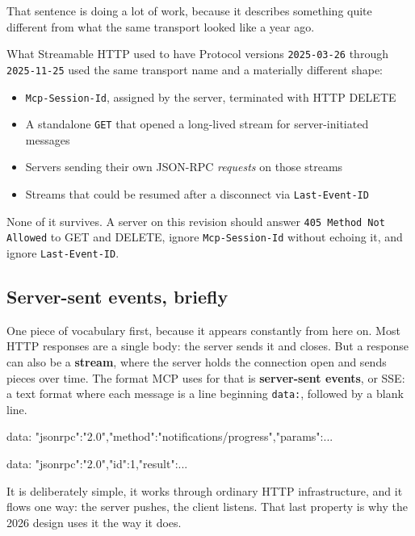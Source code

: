 That sentence is doing a lot of work, because it describes something quite
different from what the same transport looked like a year ago.

\begin{legacybox}{What Streamable HTTP used to have}
Protocol versions \texttt{2025-03-26} through \texttt{2025-11-25} used the same
transport name and a materially different shape:

\begin{itemize}[leftmargin=1.4em, itemsep=2pt]
\item \texttt{Mcp-Session-Id}, assigned by the server, terminated with HTTP DELETE
\item A standalone \texttt{GET} that opened a long-lived stream for
      server-initiated messages
\item Servers sending their own JSON-RPC \emph{requests} on those streams
\item Streams that could be resumed after a disconnect via \texttt{Last-Event-ID}
\end{itemize}

None of it survives. A server on this revision should answer \texttt{405 Method
Not Allowed} to GET and DELETE, ignore \texttt{Mcp-Session-Id} without echoing
it, and ignore \texttt{Last-Event-ID}.
\end{legacybox}

\subsection{Server-sent events, briefly}

One piece of vocabulary first, because it appears constantly from here on. Most HTTP responses are a single body: the server sends it and closes. But a
response can also be a \textbf{stream}, where the server holds the connection
open and sends pieces over time. The format MCP uses for that is
\textbf{server-sent events}, or SSE: a text format where each message is a line
beginning \texttt{data:}, followed by a blank line.

\begin{plain}
data: {"jsonrpc":"2.0","method":"notifications/progress","params":{...}}

data: {"jsonrpc":"2.0","id":1,"result":{...}}

\end{plain}

It is deliberately simple, it works through ordinary HTTP infrastructure, and
it flows one way: the server pushes, the client listens. That last property is
why the 2026 design uses it the way it does.

